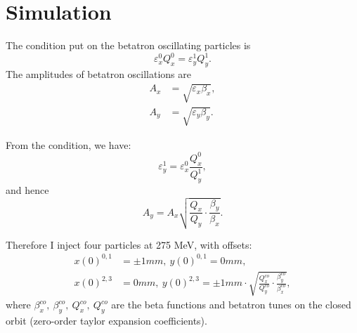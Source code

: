 \documentclass{article}
\newcommand{\emi}{\varepsilon}
\begin{document}
\section{Simulation}
The condition put on the betatron oscillating particles is
\[
\emi_x^0Q_x^0 = \emi_y^1Q_y^1.
\]
The amplitudes of betatron oscillations are
\begin{align*}
  A_x &= \sqrt{\emi_x\beta_x}, \\
  A_y &= \sqrt{\emi_y\beta_y}.
\end{align*}

From the condition, we have:
\[
\emi_y^1 = \emi_x^0\frac{Q_x^0}{Q_y^1},
\]
and hence
\[
A_y = A_x\sqrt{\frac{Q_x}{Q_y}\cdot \frac{\beta_y}{\beta_x}}.
\]

Therefore I inject four particles at 275 MeV, with offsets:
\begin{align*}
  x(0)^{0,1} &= \pm1mm,~ y(0)^{0,1} = 0mm, \\
  x(0)^{2,3} &= 0mm,~ y(0)^{2,3} = \pm1mm \cdot \sqrt{\frac{Q_x^{co}}{Q_y^{co}}\cdot \frac{\beta_y^{co}}{\beta_x^{co}}},
\end{align*}
where $\beta_x^{co},~\beta_y^{co},~Q_x^{co},~Q_y^{co}$ are the beta functions and betatron tunes on the closed orbit (zero-order taylor expansion coefficients).
\end{document}
